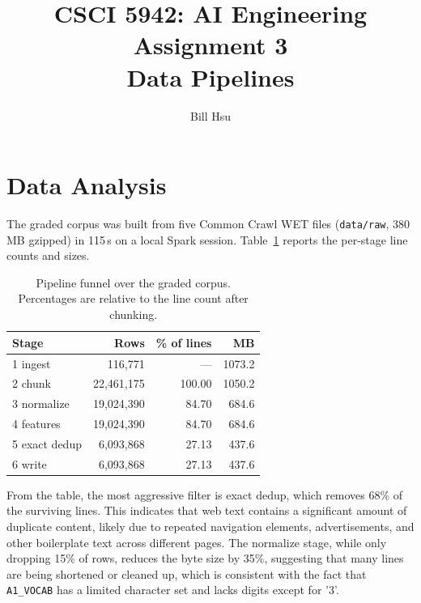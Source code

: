 \documentclass[10pt]{article}
\begin{document}
\title{CSCI 5942: AI Engineering Assignment 3\\Data Pipelines}
\author{Bill Hsu}
\maketitle

\section{Data Analysis}

The graded corpus was built from five Common Crawl WET files
(\texttt{data/raw}, 380\,MB gzipped) in 115\,s on a local Spark session.
Table~\ref{tab:funnel} reports the per-stage line counts and sizes. 


\begin{table}[htbp]
\caption{Pipeline funnel over the graded corpus. Percentages are relative
to the line count after chunking.}
\label{tab:funnel}
\centering
\begin{tabular}{lrrr}
\toprule
Stage & Rows & \% of lines & MB \\
\midrule
1 ingest      & 116{,}771    & ---    & 1073.2 \\
2 chunk       & 22{,}461{,}175 & 100.00 & 1050.2 \\
3 normalize   & 19{,}024{,}390 & 84.70  & 684.6 \\
4 features    & 19{,}024{,}390 & 84.70  & 684.6 \\
5 exact dedup & 6{,}093{,}868  & 27.13  & 437.6 \\
6 write       & 6{,}093{,}868  & 27.13  & 437.6 \\
\bottomrule
\end{tabular}
\end{table}

From the table, the most aggressive filter is exact dedup, which removes
68\% of the surviving lines. This indicates that web text contains a 
significant amount of duplicate content, likely due to repeated navigation 
elements, advertisements, and other boilerplate text across different pages. 
The normalize stage, while only dropping 15\% of rows, reduces the byte size 
by 35\%, suggesting that many lines are being shortened or cleaned up, which
is consistent with the fact that \texttt{A1\_VOCAB} has a limited character set
and lacks digits except for '3'.
\end{document}
